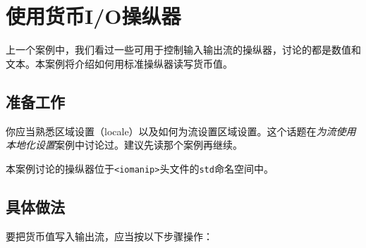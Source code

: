 
\section{使用货币I/O操纵器}



上一个案例中，我们看过一些可用于控制输入输出流的操纵器，讨论的都是数值和文本。本案例将介绍如何用标准操纵器读写货币值。



\subsection{准备工作}



你应当熟悉区域设置（locale）以及如何为流设置区域设置。这个话题在\textit{为流使用本地化设置}案例中讨论过。建议先读那个案例再继续。



本案例讨论的操纵器位于\texttt{<\allowbreak{}iomanip>}头文件的\texttt{std}命名空间中。



\subsection{具体做法}



要把货币值写入输出流，应当按以下步骤操作：



